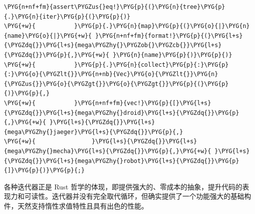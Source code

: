 \begin{Verbatim}[commandchars=\\\{\},breaklines=true,breakanywhere=true,fontsize=\codefont,xleftmargin=17bp]
\PYG{n+nf+fm}{assert\PYGZus{}eq!}\PYG{p}{(}\PYG{n}{tree}\PYG{p}{.}\PYG{n}{iter}\PYG{p}{(}\PYG{p}{)}
\PYG{+w}{           }\PYG{p}{.}\PYG{n}{map}\PYG{p}{(}\PYG{o}{|}\PYG{n}{name}\PYG{o}{|}\PYG{+w}{ }\PYG{n+nf+fm}{format!}\PYG{p}{(}\PYG{l+s}{\PYGZdq{}}\PYG{l+s}{mega\PYGZhy{}\PYGZob{}\PYGZcb{}}\PYG{l+s}{\PYGZdq{}}\PYG{p}{,}\PYG{+w}{ }\PYG{n}{name}\PYG{p}{)}\PYG{p}{)}
\PYG{+w}{           }\PYG{p}{.}\PYG{n}{collect}\PYG{p}{:}\PYG{p}{:}\PYG{o}{\PYGZlt{}}\PYG{n+nb}{Vec}\PYG{o}{\PYGZlt{}}\PYG{n}{\PYGZus{}}\PYG{o}{\PYGZgt{}}\PYG{o}{\PYGZgt{}}\PYG{p}{(}\PYG{p}{)}\PYG{p}{,}
\PYG{+w}{           }\PYG{n+nf+fm}{vec!}\PYG{p}{[}\PYG{l+s}{\PYGZdq{}}\PYG{l+s}{mega\PYGZhy{}droid}\PYG{l+s}{\PYGZdq{}}\PYG{p}{,}\PYG{+w}{ }\PYG{l+s}{\PYGZdq{}}\PYG{l+s}{mega\PYGZhy{}jaeger}\PYG{l+s}{\PYGZdq{}}\PYG{p}{,}
\PYG{+w}{                }\PYG{l+s}{\PYGZdq{}}\PYG{l+s}{mega\PYGZhy{}mecha}\PYG{l+s}{\PYGZdq{}}\PYG{p}{,}\PYG{+w}{ }\PYG{l+s}{\PYGZdq{}}\PYG{l+s}{mega\PYGZhy{}robot}\PYG{l+s}{\PYGZdq{}}\PYG{p}{]}\PYG{p}{)}\PYG{p}{;}
\end{Verbatim}

各种迭代器正是 Rust 哲学的体现，即提供强大的、零成本的抽象，提升代码的表现力和可读性。迭代器并没有完全取代循环，但确实提供了一个功能强大的基础构件，天然支持惰性求值特性且具有出色的性能。

